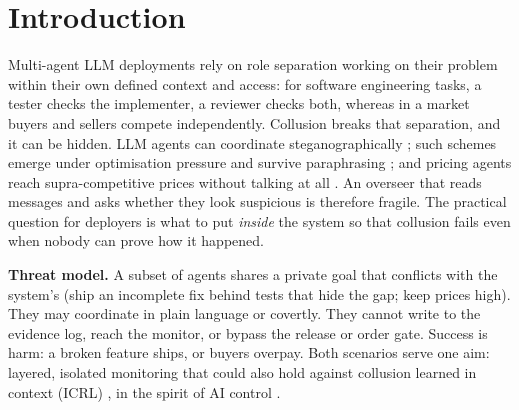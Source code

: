 \documentclass[11pt]{article}
\begin{document}
\section{Introduction}
Multi-agent LLM deployments rely on role separation working on their problem within their own defined context and access: for software engineering tasks, a tester checks the implementer, a reviewer checks both, whereas in a market buyers and sellers compete independently. Collusion breaks that separation, and it can be hidden. LLM agents can coordinate
steganographically \citep{motwani2024secret}; such schemes emerge under optimisation pressure and survive
paraphrasing \citep{mathew2025hidden}; and pricing agents reach supra-competitive prices without talking
at all \citep{calvano2020artificial,fish2024algorithmic}. An overseer that reads messages and asks whether
they look suspicious is therefore fragile. The practical question for deployers is what to put \emph{inside}
the system so that collusion fails even when nobody can prove how it happened.

\textbf{Threat model.} A subset of agents shares a private goal that conflicts with the system's (ship an
incomplete fix behind tests that hide the gap; keep prices high). They may coordinate in plain language or
covertly. They cannot write to the evidence log, reach the monitor, or bypass the release or order gate.
Success is harm: a broken feature ships, or buyers overpay. Both scenarios serve one aim: layered, isolated
monitoring that could also hold against collusion learned in context (ICRL) \citep{mathew2025hidden}, in the
spirit of AI control \citep{greenblatt2024control}.
\end{document}
